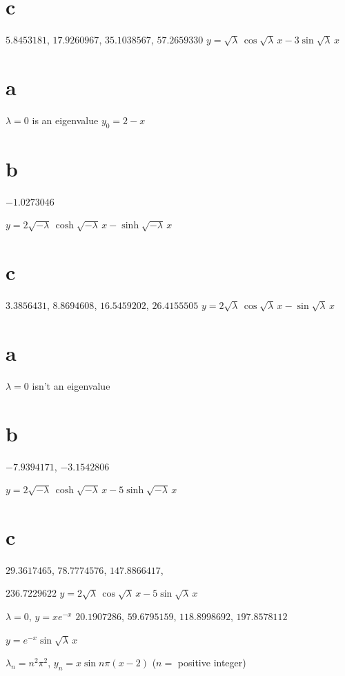 \quad \quad
\part{c} $5.8453181$, $17.9260967$, $35.1038567$, $57.2659330$
$y=\sqrt{\lambda}\,\cos\sqrt{\lambda}\,x-3\sin\sqrt{\lambda}\,x$

\smallskip

 \part{a} $\lambda=0$ is  an eigenvalue\;   $y_{0}=2-x$\;
 \part{b} $-1.0273046  $

\quad \quad
$y=2\sqrt{-\lambda}\,\cosh\sqrt{-\lambda}\,x-\sinh\sqrt{-\lambda}\,x$
\part{c} $3.3856431$, $8.8694608$, $16.5459202$, \quad \quad $26.4155505$
$y=2\sqrt{\lambda}\,\cos\sqrt{\lambda}\,x-\sin\sqrt{\lambda}\,x$

\smallskip

 \part{a} $\lambda=0$ isn't  an eigenvalue\;   \part{b} $-7.9394171$,
$-3.1542806$

\quad \quad
$y=2\sqrt{-\lambda}\,\cosh\sqrt{-\lambda}\,x-5\sinh\sqrt{-\lambda}\,x$
\part{c} $29.3617465$, $78.7774576$, $147.8866417$,

\quad \quad
$236.7229622$
$y=2\sqrt{\lambda}\,\cos\sqrt{\lambda}\,x-5\sin\sqrt{\lambda}\,x$

\smallskip

 $\lambda=0$, $y=xe^{-x}$   $20.1907286$, $59.6795159$, $118.8998692$,
$197.8578112$

\quad \quad
$y=e^{-x}\sin\sqrt{\lambda}\,x$

  $\lambda_{n}=n^{2}\pi^{2}$, $y_{n}=x\sin n\pi(x-2)$\;    ($n=$
positive integer)

